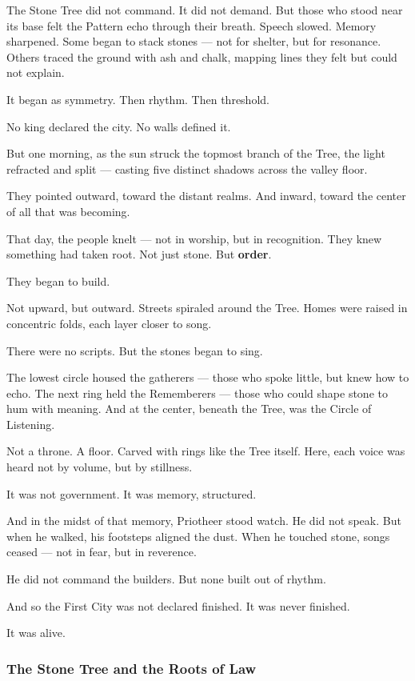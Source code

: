 \documentclass[12pt]{article}
\begin{document}
The Stone Tree did not command. It did not demand.  
But those who stood near its base felt the Pattern echo through their breath.  
Speech slowed. Memory sharpened.  
Some began to stack stones — not for shelter, but for resonance.  
Others traced the ground with ash and chalk, mapping lines they felt but could not explain.

It began as symmetry.  
Then rhythm.  
Then threshold.

No king declared the city.  
No walls defined it.

But one morning, as the sun struck the topmost branch of the Tree, the light refracted and split —  
casting five distinct shadows across the valley floor.

They pointed outward, toward the distant realms.  
And inward, toward the center of all that was becoming.

That day, the people knelt — not in worship, but in recognition.  
They knew something had taken root.  
Not just stone.  
But \textbf{order}.

They began to build.

Not upward, but outward.  
Streets spiraled around the Tree.  
Homes were raised in concentric folds, each layer closer to song.

There were no scripts.  
But the stones began to sing.

The lowest circle housed the gatherers — those who spoke little, but knew how to echo.  
The next ring held the Rememberers — those who could shape stone to hum with meaning.  
And at the center, beneath the Tree, was the Circle of Listening.

Not a throne.  
A floor.  
Carved with rings like the Tree itself.  
Here, each voice was heard not by volume, but by stillness.

It was not government.  
It was memory, structured.

And in the midst of that memory, Priotheer stood watch.  
He did not speak.  
But when he walked, his footsteps aligned the dust.  
When he touched stone, songs ceased — not in fear, but in reverence.

He did not command the builders.  
But none built out of rhythm.

And so the First City was not declared finished.  
It was never finished.

It was alive.

\dotfill

\subsubsection*{The Stone Tree and the Roots of Law}
\end{document}
